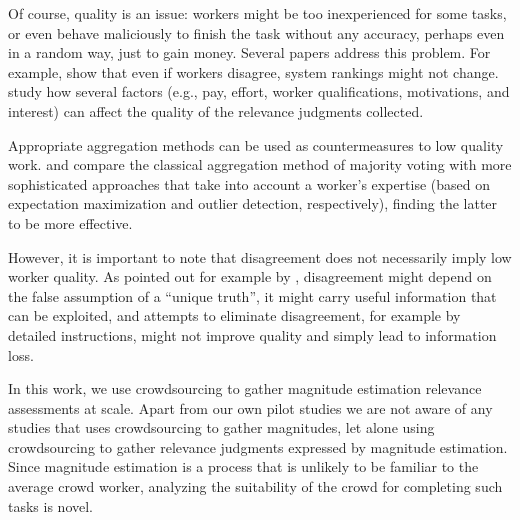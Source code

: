 Of course, quality is an issue: workers might be too inexperienced for
some tasks, or even behave maliciously to finish the task without any
accuracy, perhaps even in a random way, just to gain money. 
Several papers address this problem.
For example, \citet{Clough2013} show that even if workers disagree,
system rankings might not change. 
\citet{Kazai2013} study how several factors (e.g., pay, effort, worker
qualifications, motivations, and interest) can affect the quality of
the relevance judgments collected.

Appropriate aggregation methods can be used as countermeasures to low
quality work. 
\citet{Hosseini:2012} and \citet{Jung2011} compare the classical
aggregation method of majority voting with more sophisticated
approaches that take into account a worker's expertise (based on
expectation maximization and outlier detection, respectively), finding
the latter to be more effective. 

However, it is important to note that disagreement does
not necessarily imply low worker quality.
As pointed out for example by \citet{aroyo2015truth}, disagreement
might depend on the false assumption of a ``unique truth'', it might
carry useful information that can be exploited, and attempts to
eliminate disagreement, for example by detailed instructions, might not
improve quality and simply lead to information loss.

In this work, we use crowdsourcing to gather magnitude estimation
relevance assessments at scale.
Apart from our own pilot studies \citep{SchMad14,MadMiz15} we
are not aware of any studies that uses crowdsourcing to gather magnitudes,
let alone using crowdsourcing to gather relevance judgments expressed
by magnitude estimation.
Since magnitude estimation is a process that is unlikely to be familiar
to the average crowd worker, analyzing the suitability of the crowd for
completing such tasks is novel.



